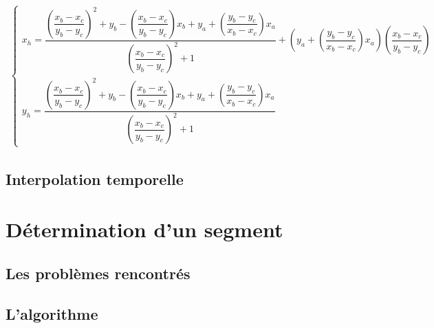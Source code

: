 \begin{align}
	\begin{cases}
		 x_h = \dfrac{\left( \dfrac{x_b - x_c}{y_b - y_c}\right)^2 + y_b - \left( \dfrac{x_b - x_c}{y_b - y_c}\right) x_b + y_a + \left( \dfrac{y_b - y_c}{x_b - x_c}\right) x_a}{\left( \dfrac{x_b - x_c}{y_b - y_c}\right)^2 + 1} + \left( y_a + \left( \dfrac{y_b - y_c}{x_b - x_c}\right) x_a\right) \left( \dfrac{x_b - x_c}{y_b - y_c}\right)  \\
    	 y_h = \dfrac{\left( \dfrac{x_b - x_c}{y_b - y_c}\right)^2 + y_b - \left( \dfrac{x_b - x_c}{y_b - y_c}\right) x_b + y_a + \left( \dfrac{y_b - y_c}{x_b - x_c}\right) x_a}{\left( \dfrac{x_b - x_c}{y_b - y_c}\right)^2 + 1}
	\end{cases}
\end{align}

\subsection{Interpolation temporelle}

\section{Détermination d'un segment}
\subsection{Les problèmes rencontrés}
\subsection{L'algorithme}